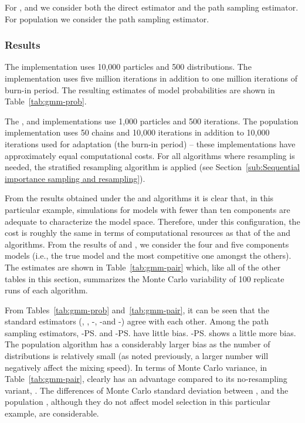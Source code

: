 For \smc[2], \smc[3] and \ais we consider both the direct estimator and the
path sampling estimator. For population \mcmc we consider the path sampling
estimator.

\subsubsection{Results}
\label{sec:gmm_res}

The \smc[1] implementation uses 10,000 particles and 500 distributions. The
\rjmcmc implementation uses five million iterations in addition to one million
iterations of burn-in period. The resulting estimates of model probabilities
are shown in Table~\ref{tab:gmm-prob}.

The \smc[2], \smc[3] and \ais implementations use 1,000 particles and 500
iterations. The population \mcmc implementation uses 50 chains and 10,000
iterations in addition to 10,000 iterations used for adaptation (the burn-in
period) -- these implementations have approximately equal computational costs.
For all algorithms where resampling is needed, the stratified resampling
algorithm is applied (see Section~\ref{sub:Sequential importance sampling and
  resampling}).

From the results obtained under the \smc[1] and \rjmcmc algorithms it is clear
that, in this particular example, simulations for models with fewer than ten
components are adequate to characterize the model space. Therefore, under this
configuration, the cost is roughly the same in terms of computational
resources as that of the \smc[1] and \rjmcmc algorithms. From the results of
\rjmcmc and \smc[1], we consider the four and five components models (i.e.,
the true model and the most competitive one amongst the others). The estimates
are shown in Table~\ref{tab:gmm-pair} which, like all of the other tables in
this section, summarizes the Monte Carlo variability of 100 replicate runs of
each algorithm.




From Tables~\ref{tab:gmm-prob} and~\ref{tab:gmm-pair}, it can be seen that the
standard estimators (\rjmcmc, \smc[1], \smc[2]-\ds, \smc[3]-\ds and \ais-\ds)
agree with each other. Among the path sampling estimators, \smc[2]-\ps and
\ais-\ps have little bias. \smc[3]-\ps shows a little more bias. The
population \mcmc algorithm has a considerably larger bias as the number of
distributions is relatively small (as noted previously, a larger number will
negatively affect the mixing speed). In terms of Monte Carlo variance, in
Table~\ref{tab:gmm-pair}, \smc[2] clearly has an advantage compared to its
no-resampling variant, \ais. The differences of Monte Carlo standard deviation
between \smc[2], \smc[3] and the population \mcmc, although they do not affect
model selection in this particular example, are considerable.

